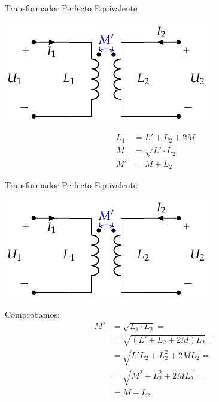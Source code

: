 \documentclass[aspectratio=169, usenames,svgnames,dvipsnames]{beamer}
\begin{document}
\begin{frame}[label={sec:orgb44b725}]{Transformador Perfecto Equivalente}
\begin{center}
\includegraphics[height=0.5\textheight]{../figs/AutoTrafo_TrafoPerfecto.pdf}
\end{center}

\begin{align*}
  L_1 &= L' + L_2 + 2M\\
  M &= \sqrt{L' \cdot L_2}\\
  M' &= M + L_2
\end{align*}
\end{frame}
\begin{frame}[label={sec:org19a7a5c}]{Transformador Perfecto Equivalente}
\begin{center}
\includegraphics[height=0.35\textheight]{../figs/AutoTrafo_TrafoPerfecto.pdf}
\end{center}
Comprobamos:
\begin{align*}
  M' &= \sqrt{L_1 \cdot L_2} = \\
     &= \sqrt{(L' + L_2 + 2M) L_2} =\\
     &= \sqrt{L'L_2 + L_2^2 + 2ML_2} =\\
     &= \sqrt{M^2 + L_2^2 + 2ML_2} = \\
     &= M + L_2
\end{align*}
\end{frame}
\end{document}
